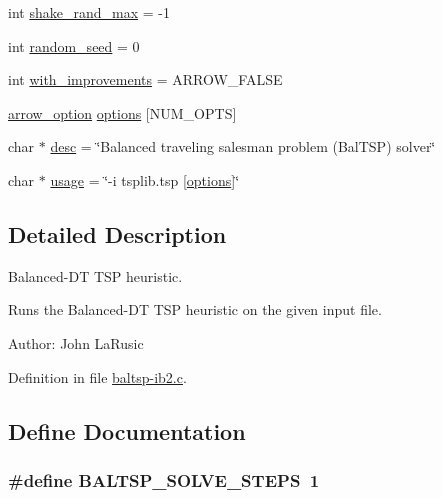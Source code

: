 \begin{CompactItemize}
\item 
int \hyperlink{bin_2baltsp-ib2_8c_bcacd5fab89a9f3eaab5401c5001b4c5}{shake\_\-rand\_\-max} = -1
\item 
int \hyperlink{bin_2baltsp-ib2_8c_d9059bc845096b2f05414a66c836b4ee}{random\_\-seed} = 0
\item 
int \hyperlink{bin_2baltsp-ib2_8c_91079460b00ac08193d5ee47094f8f70}{with\_\-improvements} = ARROW\_\-FALSE
\item 
\hyperlink{structarrow__option}{arrow\_\-option} \hyperlink{bin_2baltsp-ib2_8c_cea6a9709d519c143f30db401a0d0c72}{options} \mbox{[}NUM\_\-OPTS\mbox{]}
\item 
char $\ast$ \hyperlink{bin_2baltsp-ib2_8c_3aad16fd4bea1b9717f232ea75ad6449}{desc} = \char`\"{}Balanced traveling salesman problem (BalTSP) solver\char`\"{}
\item 
char $\ast$ \hyperlink{bin_2baltsp-ib2_8c_adebe2487a2c5240ab6cd02c83add0bf}{usage} = \char`\"{}-i tsplib.tsp \mbox{[}\hyperlink{tourinfo_8c_cea6a9709d519c143f30db401a0d0c72}{options}\mbox{]}\char`\"{}
\end{CompactItemize}


\subsection{Detailed Description}
Balanced-DT TSP heuristic. 

Runs the Balanced-DT TSP heuristic on the given input file.

\begin{Desc}
\item[Author:]John LaRusic \end{Desc}


Definition in file \hyperlink{bin_2baltsp-ib2_8c-source}{baltsp-ib2.c}.

\subsection{Define Documentation}
\hypertarget{bin_2baltsp-ib2_8c_d9b2b3cc92b48bea976b603f970e8e41}{
\subsubsection[{BALTSP\_\-SOLVE\_\-STEPS}]{\setlength{\rightskip}{0pt plus 5cm}\#define BALTSP\_\-SOLVE\_\-STEPS~1}}
\label{bin_2baltsp-ib2_8c_d9b2b3cc92b48bea976b603f970e8e41}


